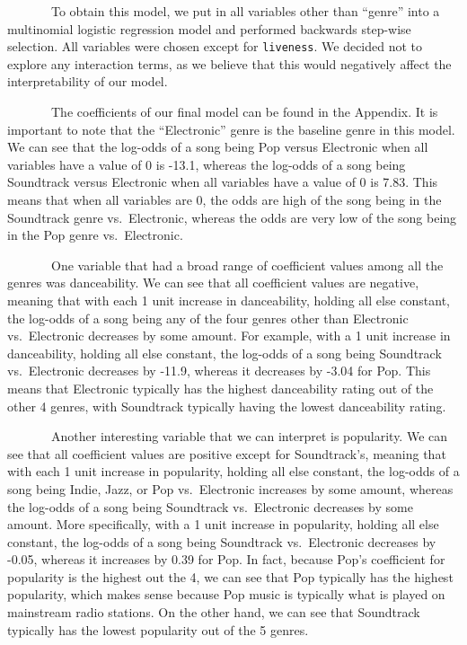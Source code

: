 \documentclass[
]{article}
\begin{document}
~~~~~~~To obtain this model, we put in all variables other than
``genre'' into a multinomial logistic regression model and performed
backwards step-wise selection. All variables were chosen except for
\texttt{liveness}. We decided not to explore any interaction terms, as
we believe that this would negatively affect the interpretability of our
model.

~~~~~~~The coefficients of our final model can be found in the Appendix.
It is important to note that the ``Electronic'' genre is the baseline
genre in this model. We can see that the log-odds of a song being Pop
versus Electronic when all variables have a value of 0 is -13.1, whereas
the log-odds of a song being Soundtrack versus Electronic when all
variables have a value of 0 is 7.83. This means that when all variables
are 0, the odds are high of the song being in the Soundtrack genre
vs.~Electronic, whereas the odds are very low of the song being in the
Pop genre vs.~Electronic.

~~~~~~~One variable that had a broad range of coefficient values among
all the genres was danceability. We can see that all coefficient values
are negative, meaning that with each 1 unit increase in danceability,
holding all else constant, the log-odds of a song being any of the four
genres other than Electronic vs.~Electronic decreases by some amount.
For example, with a 1 unit increase in danceability, holding all else
constant, the log-odds of a song being Soundtrack vs.~Electronic
decreases by -11.9, whereas it decreases by -3.04 for Pop. This means
that Electronic typically has the highest danceability rating out of the
other 4 genres, with Soundtrack typically having the lowest danceability
rating.

~~~~~~~Another interesting variable that we can interpret is popularity.
We can see that all coefficient values are positive except for
Soundtrack's, meaning that with each 1 unit increase in popularity,
holding all else constant, the log-odds of a song being Indie, Jazz, or
Pop vs.~Electronic increases by some amount, whereas the log-odds of a
song being Soundtrack vs.~Electronic decreases by some amount. More
specifically, with a 1 unit increase in popularity, holding all else
constant, the log-odds of a song being Soundtrack vs.~Electronic
decreases by -0.05, whereas it increases by 0.39 for Pop. In fact,
because Pop's coefficient for popularity is the highest out the 4, we
can see that Pop typically has the highest popularity, which makes sense
because Pop music is typically what is played on mainstream radio
stations. On the other hand, we can see that Soundtrack typically has
the lowest popularity out of the 5 genres.
\end{document}

